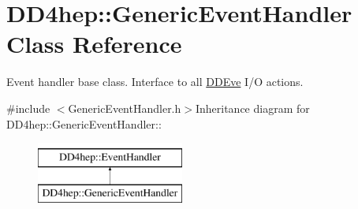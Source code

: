 \hypertarget{class_d_d4hep_1_1_generic_event_handler}{
\section{DD4hep::GenericEventHandler Class Reference}
\label{class_d_d4hep_1_1_generic_event_handler}
}


Event handler base class. Interface to all \hyperlink{struct_d_d4hep_1_1_d_d_eve}{DDEve} I/O actions.  


{\ttfamily \#include $<$GenericEventHandler.h$>$}Inheritance diagram for DD4hep::GenericEventHandler::\begin{figure}[H]
\begin{center}
\leavevmode
\includegraphics[height=2cm]{class_d_d4hep_1_1_generic_event_handler}
\end{center}
\end{figure}
